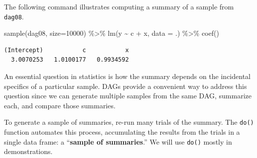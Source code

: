 \documentclass[
  letterpaper,
  DIV=11,
  numbers=noendperiod,
  oneside]{scrreprt}
\newenvironment{Shaded}{\begin{snugshade}}{\end{snugshade}}
\newcommand{\AttributeTok}[1]{\textcolor[rgb]{0.40,0.45,0.13}{#1}}
\newcommand{\DecValTok}[1]{\textcolor[rgb]{0.68,0.00,0.00}{#1}}
\newcommand{\FunctionTok}[1]{\textcolor[rgb]{0.28,0.35,0.67}{#1}}
\newcommand{\NormalTok}[1]{\textcolor[rgb]{0.00,0.23,0.31}{#1}}
\newcommand{\SpecialCharTok}[1]{\textcolor[rgb]{0.37,0.37,0.37}{#1}}
\begin{document}
The following command illustrates computing a summary of a sample from
\texttt{dag08}.

\begin{Shaded}
\begin{Highlighting}[]
\FunctionTok{sample}\NormalTok{(dag08, }\AttributeTok{size=}\DecValTok{10000}\NormalTok{) }\SpecialCharTok{\%\textgreater{}\%} 
  \FunctionTok{lm}\NormalTok{(y }\SpecialCharTok{\textasciitilde{}}\NormalTok{ c }\SpecialCharTok{+}\NormalTok{ x, }\AttributeTok{data =}\NormalTok{ .) }\SpecialCharTok{\%\textgreater{}\%}
  \FunctionTok{coef}\NormalTok{()}
\end{Highlighting}
\end{Shaded}

\begin{verbatim}
(Intercept)           c           x 
  3.0070253   1.0100177   0.9934592 
\end{verbatim}

An essential question in statistics is how the summary depends on the
incidental specifics of a particular sample. DAGs provide a convenient
way to address this question since we can generate multiple samples from
the same DAG, summarize each, and compare those summaries.

To generate a sample of summaries, re-run many trials of the summary.
The \texttt{do()} function automates this process, accumulating the
results from the trials in a single data frame: a ``\textbf{sample of
summaries}.'' We will use \texttt{do()} mostly in demonstrations.
\end{document}
